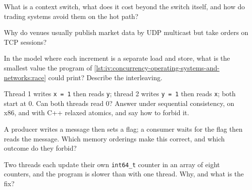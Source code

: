 \begin{interviewq}\label{iq:iv:concurrency-operating-systems-and-networks:3}
What is a context switch, what does it cost beyond the switch itself, and how do trading systems avoid them on the hot path?
\end{interviewq}

\begin{interviewq}\label{iq:iv:concurrency-operating-systems-and-networks:4}
Why do venues usually publish market data by UDP multicast but take orders on TCP sessions?
\end{interviewq}

\begin{interviewq}\label{iq:iv:concurrency-operating-systems-and-networks:5}
In the model where each increment is a separate load and store, what is the smallest value the program of
\cref{lst:iv:concurrency-operating-systems-and-networks:race} could print? Describe the interleaving.
\end{interviewq}

\begin{interviewq}\label{iq:iv:concurrency-operating-systems-and-networks:6}
Thread 1 writes \texttt{x = 1} then reads \texttt{y}; thread 2 writes \texttt{y = 1} then reads \texttt{x}; both start at 0. Can both
threads read 0? Answer under sequential consistency, on x86, and with C++ relaxed atomics, and say how to forbid it.
\end{interviewq}

\begin{interviewq}\label{iq:iv:concurrency-operating-systems-and-networks:7}
A producer writes a message then sets a flag; a consumer waits for the flag then reads the message. Which memory orderings make
this correct, and which outcome do they forbid?
\end{interviewq}

\begin{interviewq}\label{iq:iv:concurrency-operating-systems-and-networks:8}
Two threads each update their own \texttt{int64\_t} counter in an array of eight counters, and the program is slower than with one
thread. Why, and what is the fix?
\end{interviewq}

